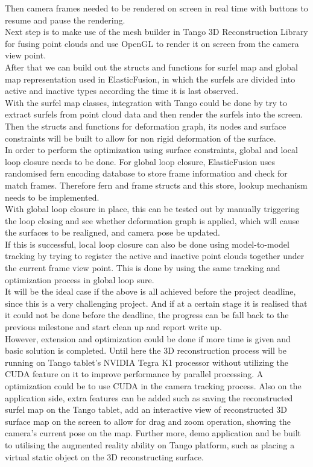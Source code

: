 \documentclass[12pt,twoside]{article}
\begin{document}
Then camera frames needed to be rendered on screen in real time with buttons to resume and pause the rendering.\\
Next step is to make use of the mesh builder in Tango 3D Reconstruction Library for fusing point clouds and use OpenGL to render it on screen from the camera view point.\\
After that we can build out the structs and functions for surfel map and global map representation used in ElasticFusion\cite{whelan2016elasticfusion}, in which the surfels are divided into active and inactive types according the time it is last observed.\\
With the surfel map classes, integration with Tango could be done by try to extract surfels from point cloud data and then render the surfels into the screen.\\
Then the structs and functions for deformation graph, its nodes and surface constraints will be built to allow for non rigid deformation of the surface.\\
In order to perform the optimization using surface constraints, global and local loop closure needs to be done. For global loop closure, ElasticFusion\cite{whelan2016elasticfusion} uses randomised fern encoding database to store frame information and check for match frames. Therefore fern and frame structs and this store, lookup mechanism needs to be implemented.\\
With global loop closure in place, this can be tested out by manually triggering the loop closing and see whether deformation graph is applied, which will cause the surfaces to be realigned, and camera pose be updated.\\
If this is successful, local loop closure can also be done using model-to-model tracking by trying to register the active and inactive point clouds together under the current frame view point. This is done by using the same tracking and optimization process in global loop sure.\\
It will be the ideal case if the above is all achieved before the project deadline, since this is a very challenging project. And if at a certain stage it is realised that it could not be done before the deadline, the progress can be fall back to the previous milestone and start clean up and report write up.\\ 
However, extension and optimization could be done if more time is given and basic solution is completed. Until here the 3D reconstruction process will be running on Tango tablet's NVIDIA Tegra K1 processor without utilizing the CUDA feature on it to improve performance by parallel processing. A optimization could be to use CUDA in the camera tracking process. Also on the application side, extra features can be added such as saving the reconstructed surfel map on the Tango tablet, add an interactive view of reconstructed 3D surface map on the screen to allow for drag and zoom operation, showing the camera's current pose on the map. Further more, demo application and be built to utilising the augmented reality ability on Tango platform, such as placing a virtual static object on the 3D reconstructing surface.\\
\end{document}
